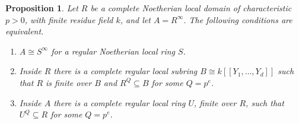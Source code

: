 \documentclass[11pt,a4paper]{amsart}
\numberwithin{equation}{section}
\newtheorem{proposition}[theorem]{Proposition}
\begin{document}
 \begin{proposition}
\label{thm:complete-model}	Let $R$ be a complete Noetherian local domain of characteristic
$p>0$, with finite residue field $k$, and let $A=R^\infty$.
 The following conditions are equivalent.
\begin{enumerate}
\item $A\cong S^\infty$ for a regular Noetherian local ring $S$.
 \item Inside $R$ there is a complete regular local subring
 	$	B\cong k[[Y_1,\ldots,Y_d]]$
 	such that $R$ is finite over $B$ and $R^Q\subseteq B$
	for some $Q=p^e$.
\item Inside $A$ there is a complete regular local ring $U$,
finite over $R$, such that $U^Q\subseteq R$ for some $Q=p^e$.
 	\end{enumerate}
\end{proposition}
 
\end{document}
